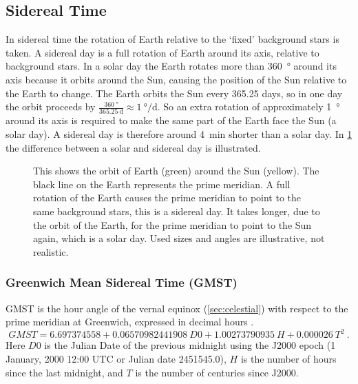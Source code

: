 \subsection{Sidereal Time}

In sidereal time the rotation of Earth relative to the `fixed'
background stars is taken. A sidereal day is a full rotation of Earth
around its axis, relative to background stars. In a solar day the Earth
rotates more than \SI{360}{\degree} around its axis because it orbits
around the Sun, causing the position of the Sun relative to the Earth to
change. The Earth orbits the Sun every 365.25 days, so in one day the
orbit proceeds by $\frac{\SI{360}{\degree}}{\SI{365.25}{\day}} \approx
\SI{1}{\degree\per\day}$. So an extra rotation of approximately
\SI{1}{\degree} around its axis is required to make the same part of the
Earth face the Sun (a solar day). A sidereal day is therefore around
\SI{4}{\minute} shorter than a solar day. In \cref{fig:sidereal_time}
the difference between a solar and sidereal day is illustrated.

\begin{figure}
    \centering
    
    \caption{This shows the orbit of Earth (green) around the Sun
             (yellow). The black line on the Earth represents the prime
             meridian. A full rotation of the Earth causes the prime
             meridian to point to the same background stars, this is a
             sidereal day. It takes longer, due to the orbit of the
             Earth, for the prime meridian to point to the Sun again,
             which is a solar day. Used sizes and angles are
             illustrative, not realistic.}
    \label{fig:sidereal_time}
\end{figure}


\subsubsection{Greenwich Mean Sidereal Time (GMST)}

GMST is the hour angle of the vernal equinox (\cref{sec:celestial})
with respect to the prime meridian at Greenwich, expressed in decimal
hours \cite{kaplan:2011aa}.
%
\begin{equation}
    \mathit{GMST} = 6.697374558 + 0.06570982441908\ \mathit{D0} +
                    1.00273790935\ H + 0.000026\ T^2 \ .
\end{equation}
%
Here $D0$ is the Julian Date of the previous midnight using the J2000
epoch (1 January, 2000 12:00 UTC or Julian date 2451545.0), $H$ is the
number of hours since the last midnight, and $T$ is the number of
centuries since J2000.

